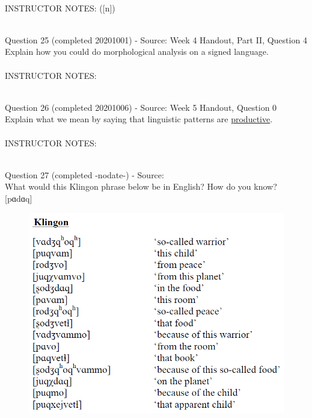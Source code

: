 \documentclass[12pt]{article}
\begin{document}
~\\
INSTRUCTOR NOTES: ([n])


~\\

{\large Question 25} (completed 20201001) - Source: Week 4 Handout, Part II, Question 4\\

Explain how you could do morphological analysis on a signed language.\\


~\\
INSTRUCTOR NOTES: 


~\\

{\large Question 26} (completed 20201006) - Source: Week 5 Handout, Question 0\\

Explain what we mean by saying that linguistic patterns are \underline{productive}.\\


~\\
INSTRUCTOR NOTES: 


~\\

{\large Question 27} (completed -nodate-) - Source: \\

What would this Klingon phrase below be in English? How do you know?\\

{[pɑdɑq]}

\begin{figure}[H]
\includegraphics{../images/klingon.png}
\end{figure}
\end{document}
